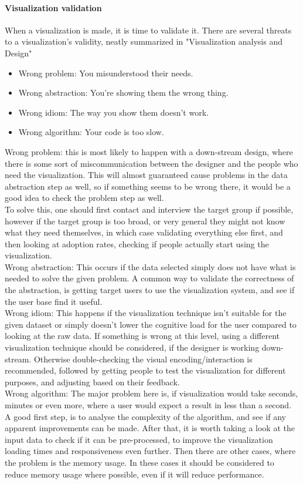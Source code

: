 \documentclass[Report.tex]{subfiles}
\begin{document}
	\paragraph{Visualization validation\\}
	When a visualization is made, it is time to validate it. There are several threats to a visualization's validity, neatly summarized in "Visualization analysis and Design" \cite[75]{Tamara}
	\begin{itemize}
		\item Wrong problem: You misunderstood their needs.
		\item Wrong abstraction: You're showing them the wrong thing.
		\item Wrong idiom: The way you show them doesn't work.
		\item Wrong algorithm: Your code is too slow.
	\end{itemize}
	Wrong problem: this is most likely to happen with a down-stream design, where there is some sort of miscommunication between the designer and the people who need the visualization. This will almost guaranteed cause problems in the data abstraction step as well, so if something seems to be wrong there, it would be a good idea to check the problem step as well.\\
	To solve this, one should first contact and interview the target group if possible, however if the target group is too broad, or very general they might not know what they need themselves, in which case validating everything else first, and then looking at adoption rates, checking if people actually start using the visualization.\\
	Wrong abstraction: This occurs if the data selected simply does not have what is needed to solve the given problem. A common way to validate the correctness of the abstraction, is getting target users to use the visualization system, and see if the user base find it useful.\\
	 Wrong idiom: This happens if the visualization technique isn't suitable for the given dataset or simply doesn't lower the cognitive load for the user compared to looking at the raw data. If something is wrong at this level, using a different visualization technique should be considered, if the designer is working down-stream. Otherwise double-checking the visual encoding/interaction is recommended, followed by getting people to test the visualization for different purposes, and adjusting based on their feedback.\\
	 Wrong algorithm: The major problem here is, if visualization would take seconds, minutes or even more, where a user would expect a result in less than a second. \\
	 A good first step, is to analyse the complexity of the algorithm, and see if any apparent improvements can be made. After that, it is worth taking a look at the input data to check if it can be pre-processed, to improve the visualization loading times and responsiveness even further. Then there are other cases, where the problem is the memory usage. In these cases it should be considered to reduce memory usage where possible, even if it will reduce performance.
\end{document}
